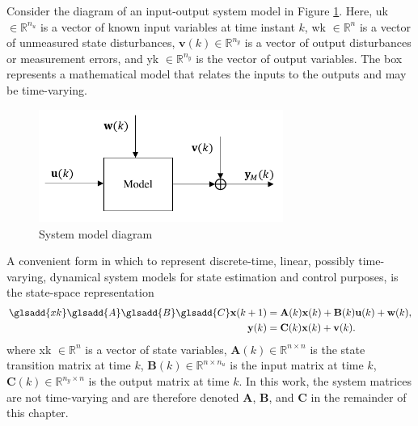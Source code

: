 Consider the diagram of an input-output system model in Figure \ref{fig:model_diag_uwvy}. Here, \gls{uk} $\in \mathbb{R}^{n_u}$ is a vector of known input variables at time instant $k$, \gls{wk} $\in \mathbb{R}^n$ is a vector of unmeasured state disturbances, $\mathbf{v}(k) \in \mathbb{R}^{n_y}$ is a vector of output disturbances or measurement errors, and \gls{yk} $\in \mathbb{R}^{n_y}$ is the vector of output variables. The box represents a mathematical model that relates the inputs to the outputs and may be time-varying. 
\begin{figure}[ht]
	\centering {}
	\includegraphics[width=8cm]{images/model_diag_uwvy.pdf}
	\caption{System model diagram}
	\label{fig:model_diag_uwvy}
\end{figure}

A convenient form in which to represent discrete-time, linear, possibly time-varying, dynamical system models for state estimation and control purposes, is the state-space representation
\begin{equation} \label{eq:ss_rep_uwy}
	\begin{aligned} \glsadd{xk} \glsadd{A} \glsadd{B} \glsadd{C}
		\mathbf{x}(k+1) &= \mathbf{A}(k) \mathbf{x}(k) + \mathbf{B}(k) \mathbf{u}(k) + \mathbf{w}(k), \\
		\mathbf{y}(k) &= \mathbf{C}(k) \mathbf{x}(k) + \mathbf{v}(k).
	\end{aligned}
\end{equation}
where \gls{xk} $\in \mathbb{R}^n$ is a vector of state variables, $\mathbf{A}(k) \in \mathbb{R}^{n \times n}$ is the state transition matrix at time $k$, $\mathbf{B}(k) \in \mathbb{R}^{n \times n_u}$ is the input matrix at time $k$, $\mathbf{C}(k) \in \mathbb{R}^{n_y \times n}$ is the output matrix at time $k$. In this work, the system matrices are not time-varying and are therefore denoted $\mathbf{A}$, $\mathbf{B}$, and $\mathbf{C}$ in the remainder of this chapter.

